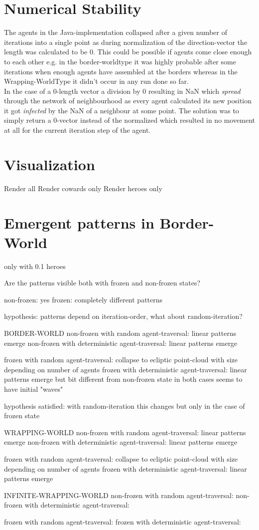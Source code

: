 \section{Numerical Stability}
The agents in the Java-implementation collapsed after a given number of iterations into a single point as during normalization of the direction-vector the length was calculated to be 0. This could be possible if agents come close enough to each other e.g. in the border-worldtype it was highly probable after some iterations when enough agents have assembled at the borders whereas in the Wrapping-WorldType it didn't occur in any run done so far. \\
In the case of a 0-length vector a division by 0  resulting in NaN which \textit{spread} through the network of neighbourhood as every agent calculated its new position it got \textit{infected} by the NaN of a neighbour at some point. The solution was to simply return a 0-vector instead of the normalized which resulted in no movement at all for the current iteration step of the agent. 

\section{Visualization}
Render all
Render cowards only
Render heroes only

\section{Emergent patterns in Border-World}
only with 0.1 heroes

Are the patterns visible both with frozen and non-frozen states?

non-frozen: yes
frozen: completely different patterns

hypothesis: patterns depend on iteration-order, what about random-iteration?

BORDER-WORLD
	non-frozen with random agent-traversal: 				linear patterns emerge
	non-frozen with deterministic agent-traversal: 			linear patterns emerge

	frozen with random agent-traversal: 					collapse to ecliptic point-cloud with size depending on number of agents
	frozen with deterministic agent-traversal: 				linear patterns emerge but bit different from non-frozen state
	in both cases seems to have initial "waves"

	hypothesis satisfied: with random-iteration this changes but only in the case of frozen state

WRAPPING-WORLD
	non-frozen with random agent-traversal: 				linear patterns emerge	
	non-frozen with deterministic agent-traversal: 			linear patterns emerge

	frozen with random agent-traversal: 					collapse to ecliptic point-cloud with size depending on number of agents
	frozen with deterministic agent-traversal: 				linear patterns emerge

INFINITE-WRAPPING-WORLD
	non-frozen with random agent-traversal: 				
	non-frozen with deterministic agent-traversal: 			

	frozen with random agent-traversal: 					
	frozen with deterministic agent-traversal: 				